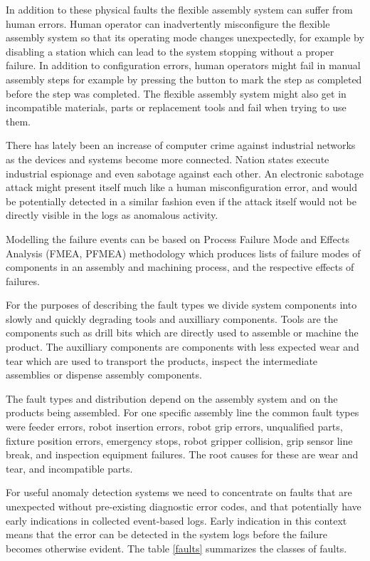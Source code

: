 \documentclass[procedia]{easychair}
\begin{document}
In addition to these physical faults the flexible
assembly system can suffer from human errors. Human operator can inadvertently misconfigure the flexible assembly system so that its operating mode changes unexpectedly,
for example by disabling a station which can lead to the system stopping without a proper failure. In addition to configuration
errors, human operators might fail in manual assembly steps for example by pressing the button to mark the step
as completed before the step was completed.
The flexible assembly system might also get in incompatible materials, parts or replacement tools and fail when trying to use them.

There has lately been an increase of computer crime against industrial networks as the devices and systems become more connected.
Nation states execute industrial espionage and even sabotage against each other\cite{stuxnet}. An electronic sabotage attack might present itself
much like a human misconfiguration error, and would be potentially detected in a similar fashion even if the attack itself would not be
directly visible in the logs as anomalous activity.

Modelling the failure events can be based on Process Failure Mode and Effects Analysis (FMEA, PFMEA) \cite{teng1996failure} methodology which produces lists of
failure modes of components
in an assembly and machining process, and the respective effects of failures.

For the purposes of describing the fault types we divide system components into slowly and
quickly degrading tools and auxilliary components. Tools are the components such as drill bits which are directly used to assemble or
machine the product. The auxilliary components are components with less expected wear and tear which are used to transport the products,
inspect the intermediate assemblies or dispense assembly components.

The fault types and distribution depend on the assembly system
and on the products being assembled. For one
specific assembly line \cite{cong1997fault} the common fault types were feeder errors, robot insertion errors,
robot grip errors, unqualified parts, fixture position errors, emergency stops, robot gripper collision,
grip sensor line break, and inspection equipment failures. The root causes for these are wear and tear, and incompatible parts.

For useful anomaly detection systems we need to concentrate on faults that are unexpected without pre-existing diagnostic error codes, and that potentially have early indications
in collected event-based logs. Early indication in this context means that the error can be detected in the system logs before the failure becomes otherwise evident.
The table \ref{faults} summarizes the classes of faults.
\end{document}
